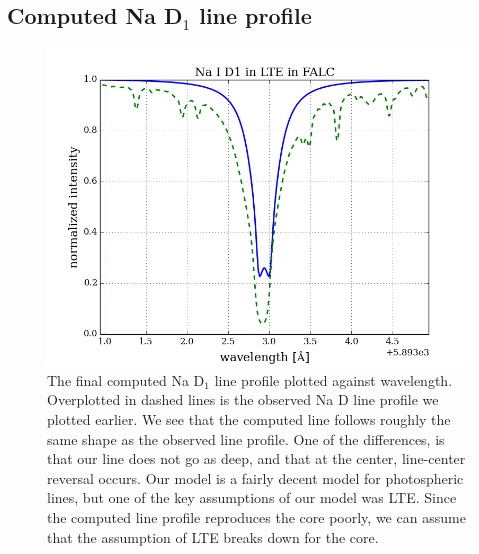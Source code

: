 \documentclass{article}
\begin{document}
\subsection{Computed Na D$_1$ line profile}

\begin{figure}[H]
  \centering
  \includegraphics[scale=0.5]{../figures/Na_D1.png}
  \caption{The final computed Na D$_1$ line profile plotted against wavelength. Overplotted in dashed lines is the observed Na D line profile we plotted earlier. We see that the computed line follows roughly the same shape as the observed line profile. One of the differences, is that our line does not go as deep, and that at the center, line-center reversal occurs. Our model is a fairly decent model for photospheric lines, but one of the key assumptions of our model was LTE. Since the computed line profile reproduces the core poorly, we can assume that the assumption of LTE breaks down for the core.}
\end{figure}
\end{document}
